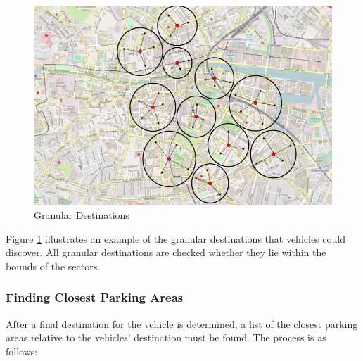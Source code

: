 \begin{figure}[H]
    \centering
    \includegraphics[width=\textwidth]{./Images/DESTINATIONSECTORS.png}
    \caption{Granular Destinations}
    \label{fig:destination_sectors}
\end{figure}

Figure \ref{fig:destination_sectors} illustrates an example of the granular destinations that vehicles could discover. All granular destinations are checked whether they lie within the bounds of the sectors.

\subsubsection{Finding Closest Parking Areas}
After a final destination for the vehicle is determined, a list of the closest parking areas relative to the vehicles' destination must be found. The process is as follows: 

